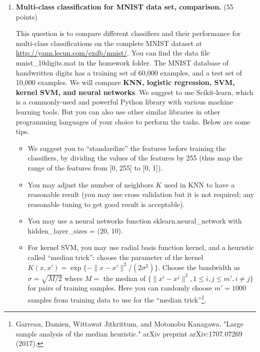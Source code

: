 \documentclass[twoside,10pt]{article}
\begin{document}
\begin{enumerate}
\item {\bf Multi-class classification for MNIST data set, comparison.} (55 points)

This question is to compare different classifiers and their performance for multi-class classifications on the complete MNIST dataset at \url{http://yann.lecun.com/exdb/mnist/}. You can find the data file \textsf{mnist\_10digits.mat} in the homework folder. The MNIST database of handwritten digits has a training set of 60,000 examples, and a test set of 10,000 examples. We will compare {\bf KNN, logistic regression, SVM, kernel SVM, and  neural networks}. We suggest to use \textsf{Scikit-learn}, which is a commonly-used and powerful \textsf{Python} library with various machine learning tools. But you can also use other similar libraries in other programming languages of your choice to perform the tasks. Below are some tips. 

\begin{itemize}

\item We suggest you to ``standardize'' the features before training the classifiers, by dividing the values of the features by 255 (thus map the range of the features from [0, 255] to [0, 1]).

\item You may adjust the number of neighbors $K$ used in KNN to have a reasonable result (you may use cross validation but it is not required; any reasonable tuning to get good result is acceptable).

\item You may use a neural networks function \textsf{sklearn.neural\_network} with \textsf{hidden\_layer\_sizes = (20, 10)}. 


\item For kernel SVM, you may use  radial basis function kernel, and a heuristic called ``median trick'': choose the parameter of the kernel $K(x, x') = \exp\{-\|x-x'\|^2/(2\sigma^2)\}$. Choose the bandwidth as $\sigma=\sqrt{M/2}$ where $M =$ the median of $\{\|x^i-x^j\|^2, 1\leq i, j \leq m', i\neq j \}$ for pairs of training samples. Here you can randomly choose $m'=1000$ samples from training data to use for the ``median trick''\footnote{Garreau, Damien, Wittawat Jitkrittum, and Motonobu Kanagawa. "Large sample analysis of the median heuristic." arXiv preprint arXiv:1707.07269 (2017).}.


\end{itemize}
\end{enumerate}
\end{document}
